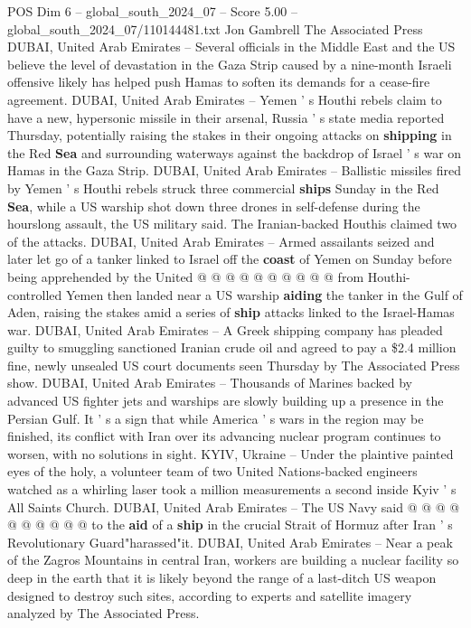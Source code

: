 \begin{textsample}{POS Dim 6 – global\_south\_2024\_07 – Score 5.00 – global\_south\_2024\_07/110144481.txt}  \label{ex:f6_pos_314}
Jon Gambrell The Associated Press DUBAI, United Arab Emirates -- Several officials in the Middle East and the US believe the level of devastation in the Gaza Strip caused by a nine-month Israeli offensive likely has helped push Hamas to soften its demands for a cease-fire agreement.
DUBAI, United Arab Emirates -- Yemen ' s Houthi rebels claim to have a new, hypersonic missile in their arsenal, Russia ' s state media reported Thursday, potentially raising the stakes in their ongoing attacks on \textbf{shipping} in the Red \textbf{Sea} and surrounding waterways against the backdrop of Israel ' s war on Hamas in the Gaza Strip.
DUBAI, United Arab Emirates -- Ballistic missiles fired by Yemen ' s Houthi rebels struck three commercial \textbf{ships} Sunday in the Red \textbf{Sea}, while a US warship shot down three drones in self-defense during the hourslong assault, the US military said.
The Iranian-backed Houthis claimed two of the attacks.
DUBAI, United Arab Emirates -- Armed assailants seized and later let go of a tanker linked to Israel off the \textbf{coast} of Yemen on Sunday before being apprehended by the United @ @ @ @ @ @ @ @ @ @ from Houthi-controlled Yemen then landed near a US warship \textbf{aiding} the tanker in the Gulf of Aden, raising the stakes amid a series of \textbf{ship} attacks linked to the Israel-Hamas war.
DUBAI, United Arab Emirates -- A Greek shipping company has pleaded guilty to smuggling sanctioned Iranian crude oil and agreed to pay a \$2.4 million fine, newly unsealed US court documents seen Thursday by The Associated Press show.
DUBAI, United Arab Emirates -- Thousands of Marines backed by advanced US fighter jets and warships are slowly building up a presence in the Persian Gulf.
It ' s a sign that while America ' s wars in the region may be finished, its conflict with Iran over its advancing nuclear program continues to worsen, with no solutions in sight.
KYIV, Ukraine -- Under the plaintive painted eyes of the holy, a volunteer team of two United Nations-backed engineers watched as a whirling laser took a million measurements a second inside Kyiv ' s All Saints Church.
DUBAI, United Arab Emirates -- The US Navy said @ @ @ @ @ @ @ @ @ @ to the \textbf{aid} of a \textbf{ship} in the crucial Strait of Hormuz after Iran ' s Revolutionary Guard"harassed"it.
DUBAI, United Arab Emirates -- Near a peak of the Zagros Mountains in central Iran, workers are building a nuclear facility so deep in the earth that it is likely beyond the range of a last-ditch US weapon designed to destroy such sites, according to experts and satellite imagery analyzed by The Associated Press.

\end{textsample}
